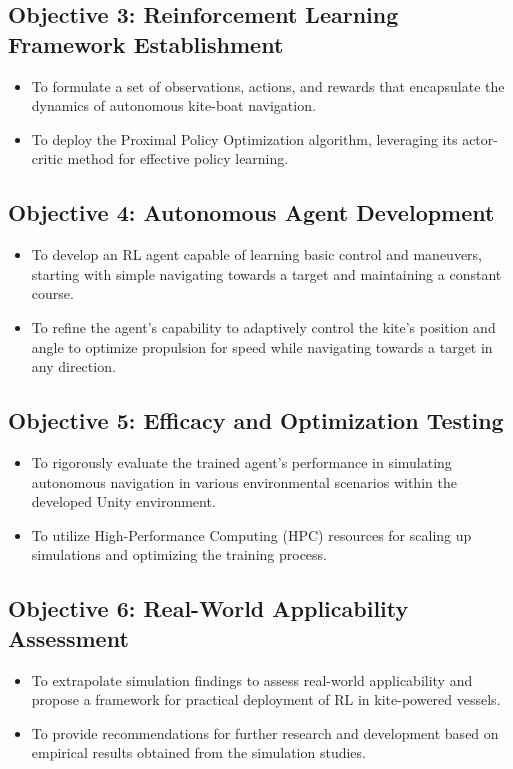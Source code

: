 \subsection*{Objective 3: Reinforcement Learning Framework Establishment}
\begin{itemize}
    \item To formulate a set of observations, actions, and rewards that encapsulate the dynamics of autonomous kite-boat navigation.
    \item To deploy the Proximal Policy Optimization algorithm, leveraging its actor-critic method for effective policy learning.
\end{itemize}

\subsection*{Objective 4: Autonomous Agent Development}
\begin{itemize}
    \item To develop an RL agent capable of learning basic control and maneuvers, starting with simple navigating towards a target and maintaining a constant course.
    \item To refine the agent's capability to adaptively control the kite's position and angle to optimize propulsion for speed while navigating towards a target in any direction.
\end{itemize}

\subsection*{Objective 5: Efficacy and Optimization Testing}
\begin{itemize}
    \item To rigorously evaluate the trained agent’s performance in simulating autonomous navigation in various environmental scenarios within the developed Unity environment.
    \item To utilize High-Performance Computing (HPC) resources for scaling up simulations and optimizing the training process.
\end{itemize}

\subsection*{Objective 6: Real-World Applicability Assessment}
\begin{itemize}
    \item To extrapolate simulation findings to assess real-world applicability and propose a framework for practical deployment of RL in kite-powered vessels.
    \item To provide recommendations for further research and development based on empirical results obtained from the simulation studies.
\end{itemize}

